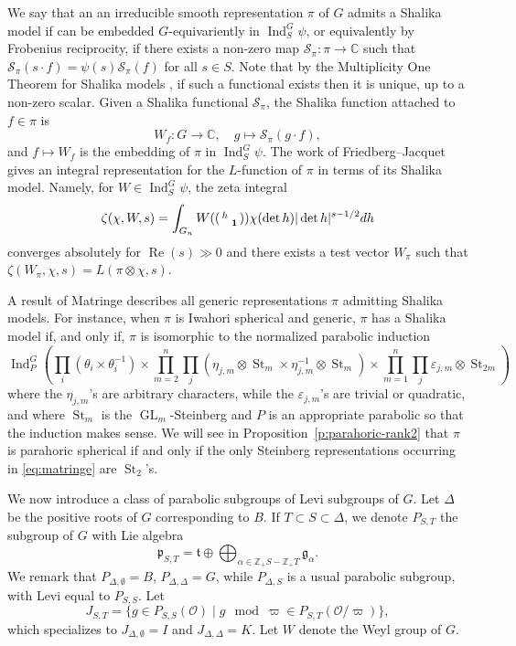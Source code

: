 \documentclass{amsart}
\theoremstyle{definition}
\newcommand{\St}{\operatorname{St}}
\newcommand{\Ind}{\operatorname{Ind}}
\newcommand{\GL}{\operatorname{GL}}
\renewcommand{\Re}{\operatorname{Re}}
\newenvironment{spmatrix}{\left(\begin{smallmatrix}}{\end{smallmatrix}\right)}
\begin{document}
{We say that an an irreducible smooth representation $\pi$ of $G$ admits a Shalika model if can be embedded $G$-equivariently in $\Ind_S^G\psi$, or equivalently by Frobenius reciprocity, if there exists a non-zero  map $\mathcal{S}_\pi:\pi \to \mathbb{C}$ such that
$\mathcal{S}_\pi(s\cdot f)=\psi(s)\mathcal{S}_\pi(f)$ for all $s\in S$. Note that by the Multiplicity One Theorem for Shalika models \cite[Prop. 6.1]{jacquet-rallis}, if such a functional exists then it  is unique, up to a non-zero scalar. Given a  Shalika functional $\mathcal{S}_\pi$, the Shalika function attached to  $f \in \pi$ is
\[W_f:G\to \mathbb{C}, \quad g\mapsto \mathcal{S}_\pi(g\cdot f), \] 
and $f\mapsto W_f$ is the  embedding of $\pi$ in $\Ind_S^G\psi$. 
The work of Friedberg--Jacquet \cite{friedberg-jacquet} gives an integral representation for the  $L$-function of $\pi$ in terms of its Shalika model. 
Namely,  for  $W\in \Ind_S^G\psi$, the zeta integral 
\[\zeta(\chi,W,s)=\int_{G_n}W(\begin{spmatrix} h&\\& \mathbf{1}\end{spmatrix})\chi(\det h)|\det h|^{s-1/2}dh\]
converges absolutely for $\Re(s)\gg 0$  and there exists a test vector $W_\pi$ such that $\zeta(W_\pi,\chi,s)=L(\pi\otimes\chi,s)$. 


A result of Matringe \cite[Cor.~1.1]{matringe:shalika} describes all generic representations $\pi$ admitting Shalika models. For instance, when $\pi$ is Iwahori spherical and generic, $\pi$ has a Shalika model  if, and only if, $\pi$ is isomorphic to the normalized parabolic induction
\begin{equation}\label{eq:matringe}
\Ind_P^G\left( \prod_i (\theta_i\times
\theta_i^{-1})\times\prod\limits_{m=2}^{n}\prod\limits_{j} (\eta_{j,m}\otimes\St_m\times\eta_{j,m}^{-1}\otimes\St_m ) \times\prod\limits_{m=1}^{n}\prod\limits_{j} \varepsilon_{j,m}\otimes\St_{2m}\right)
\end{equation}
where the $\eta_{j,m}$'s are arbitrary characters, while  the $\varepsilon_{j,m}$'s  are trivial or quadratic, and where 
$\St_m$ is the $\GL_m$-Steinberg and $P$ is an appropriate parabolic so that the induction makes sense. We will see in Proposition~\ref{p:parahoric-rank2}  that   $\pi$ is parahoric spherical if and only if the only Steinberg representations occurring in \eqref{eq:matringe} are $\St_2$'s.  


We now introduce  a  class of parabolic subgroups of Levi subgroups  of $G$. Let $\Delta$ be the positive roots of $G$
corresponding to $B$. If $T\subset S\subset \Delta$, we denote
$P_{S,T}$ the subgroup of $G$ with Lie algebra
\[\mathfrak{p}_{S,T}=\mathfrak{t} \oplus \bigoplus_{\alpha\in
  \mathbb{Z}_{+}S-\mathbb{Z}_{+}T}\mathfrak{g}_{\alpha}.\]
We remark that $P_{\Delta,\emptyset}=B$,
$P_{\Delta,\Delta}=G$, while $P_{\Delta,S}$ is a usual
parabolic subgroup, with Levi equal to $P_{S,S}$. Let 
\[J_{S,T}=\{g\in P_{S,S}(\mathcal{O})\mid g\mod\varpi\in
P_{S,T}(\mathcal{O}/\varpi)\},\]
which specializes to $J_{\Delta,\emptyset}=I$ and
$J_{\Delta,\Delta}=K$. Let $W$ denote the Weyl group of $G$. 

}
\end{document}
